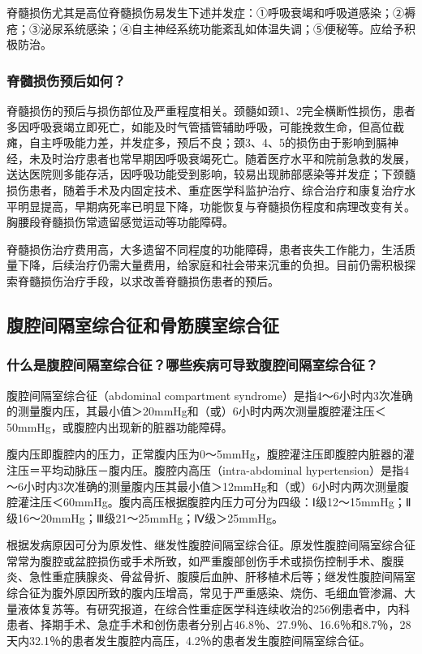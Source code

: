 脊髓损伤尤其是高位脊髓损伤易发生下述并发症：①呼吸衰竭和呼吸道感染；②褥疮；③泌尿系统感染；④自主神经系统功能紊乱如体温失调；⑤便秘等。应给予积极防治。

\subsubsection{脊髓损伤预后如何？}

脊髓损伤的预后与损伤部位及严重程度相关。颈髓如颈1、2完全横断性损伤，患者多因呼吸衰竭立即死亡，如能及时气管插管辅助呼吸，可能挽救生命，但高位截瘫，自主呼吸能力差，并发症多，预后不良；颈3、4、5的损伤由于影响到膈神经，未及时治疗患者也常早期因呼吸衰竭死亡。随着医疗水平和院前急救的发展，送达医院则多能存活，因呼吸功能受到影响，较易出现肺部感染等并发症；下颈髓损伤患者，随着手术及内固定技术、重症医学科监护治疗、综合治疗和康复治疗水平明显提高，早期病死率已明显下降，功能恢复与脊髓损伤程度和病理改变有关。胸腰段脊髓损伤常遗留感觉运动等功能障碍。

脊髓损伤治疗费用高，大多遗留不同程度的功能障碍，患者丧失工作能力，生活质量下降，后续治疗仍需大量费用，给家庭和社会带来沉重的负担。目前仍需积极探索脊髓损伤治疗手段，以求改善脊髓损伤患者的预后。

\subsection{腹腔间隔室综合征和骨筋膜室综合征}

\subsubsection{什么是腹腔间隔室综合征？哪些疾病可导致腹腔间隔室综合征？}

腹腔间隔室综合征（abdominal compartment
syndrome）是指4～6小时内3次准确的测量腹内压，其最小值＞20mmHg和（或）6小时内两次测量腹腔灌注压＜50mmHg，或腹腔内出现新的脏器功能障碍。

腹内压即腹腔内的压力，正常腹内压为0～5mmHg，腹腔灌注压即腹腔内脏器的灌注压＝平均动脉压－腹内压。腹腔内高压（intra-abdominal
hypertension）是指4～6小时内3次准确的测量腹内压其最小值＞12mmHg和（或）6小时内两次测量腹腔灌注压＜60mmHg。腹内高压根据腹腔内压力可分为四级：Ⅰ级12～15mmHg；Ⅱ级16～20mmHg；Ⅲ级21～25mmHg；Ⅳ级＞25mmHg。

根据发病原因可分为原发性、继发性腹腔间隔室综合征。原发性腹腔间隔室综合征常常为腹腔或盆腔损伤或手术所致，如严重腹部创伤手术或损伤控制手术、腹膜炎、急性重症胰腺炎、骨盆骨折、腹膜后血肿、肝移植术后等；继发性腹腔间隔室综合征为腹外原因所致的腹内压增高，常见于严重感染、烧伤、毛细血管渗漏、大量液体复苏等。有研究报道，在综合性重症医学科连续收治的256例患者中，内科患者、择期手术、急症手术和创伤患者分别占46.8％、27.9％、16.6％和8.7％，28天内32.1％的患者发生腹腔内高压，4.2％的患者发生腹腔间隔室综合征。

